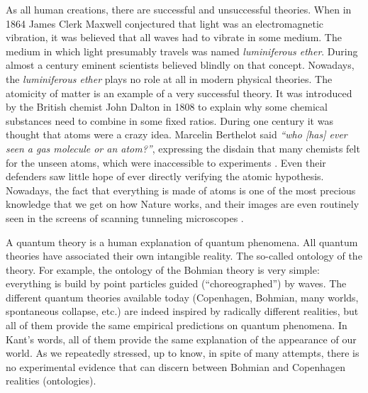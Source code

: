 \documentclass[nofootinbib, secnumarabic, amsmath, nobibnotes,11pt,aps,pra, floatfix]{revtex4-1}
\begin{document}
As all human creations, there are successful and unsuccessful theories. When in 1864 James Clerk Maxwell conjectured that light was an electromagnetic vibration, it was believed that all waves had to vibrate in some medium. The medium in which light presumably travels was named  \emph{luminiferous ether}. During almost a century eminent scientists believed blindly on that concept. Nowadays, the \emph{luminiferous ether} plays no role at all in modern physical theories\cite{om.herbert}. The atomicity of matter is an example of a very successful theory. It was introduced by the British chemist John Dalton in 1808 to explain why some chemical substances need to combine in some fixed ratios. During one century it was thought that atoms were a crazy idea. Marcelin Berthelot said \emph{``who [has] ever seen a gas molecule  or an atom?''}, expressing the disdain that many chemists felt for the unseen atoms, which were inaccessible to experiments \cite{om.herbert}. Even their defenders saw little hope of ever directly verifying the atomic hypothesis. Nowadays, the fact that everything is made of atoms is one of the most precious knowledge that we get on how Nature works\cite{feynmann}, and their images  are even routinely seen in the screens of scanning tunneling microscopes \cite{binning}. 

A quantum theory is a human explanation of quantum phenomena. All quantum theories have associated their own intangible reality. The so-called ontology of the theory.  For example, the ontology of the Bohmian theory is very simple: everything is build by point particles guided (``choreographed'') by waves.  The different quantum theories available today (Copenhagen, Bohmian, many worlds, spontaneous collapse, etc.) are indeed inspired by radically different realities, but all of them provide the same empirical predictions on quantum phenomena. In Kant's words, all of them provide the same explanation of the appearance of our world. As we repeatedly stressed, up to know, in spite of many attempts, there is no experimental evidence that can discern between Bohmian and Copenhagen realities (ontologies).
\end{document}

